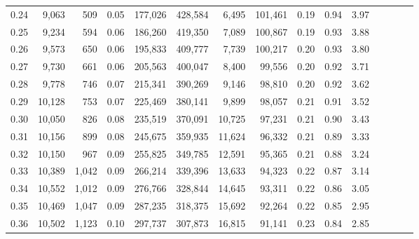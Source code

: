 \begin{tabular}{rrrcrrrrrrrrrrr}
0.24 &   9,063 &    509 &                                       0.05 &  177,026 &  428,584 &    6,495 &  101,461 &  0.19 &  0.94 &                         3.97 \\
0.25 &   9,234 &    594 &                                       0.06 &  186,260 &  419,350 &    7,089 &  100,867 &  0.19 &  0.93 &                         3.88 \\
0.26 &   9,573 &    650 &                                       0.06 &  195,833 &  409,777 &    7,739 &  100,217 &  0.20 &  0.93 &                         3.80 \\
0.27 &   9,730 &    661 &                                       0.06 &  205,563 &  400,047 &    8,400 &   99,556 &  0.20 &  0.92 &                         3.71 \\
0.28 &   9,778 &    746 &                                       0.07 &  215,341 &  390,269 &    9,146 &   98,810 &  0.20 &  0.92 &                         3.62 \\
0.29 &  10,128 &    753 &                                       0.07 &  225,469 &  380,141 &    9,899 &   98,057 &  0.21 &  0.91 &                         3.52 \\
0.30 &  10,050 &    826 &                                       0.08 &  235,519 &  370,091 &   10,725 &   97,231 &  0.21 &  0.90 &                         3.43 \\
0.31 &  10,156 &    899 &                                       0.08 &  245,675 &  359,935 &   11,624 &   96,332 &  0.21 &  0.89 &                         3.33 \\
0.32 &  10,150 &    967 &                                       0.09 &  255,825 &  349,785 &   12,591 &   95,365 &  0.21 &  0.88 &                         3.24 \\
0.33 &  10,389 &  1,042 &                                       0.09 &  266,214 &  339,396 &   13,633 &   94,323 &  0.22 &  0.87 &                         3.14 \\
0.34 &  10,552 &  1,012 &                                       0.09 &  276,766 &  328,844 &   14,645 &   93,311 &  0.22 &  0.86 &                         3.05 \\
0.35 &  10,469 &  1,047 &                                       0.09 &  287,235 &  318,375 &   15,692 &   92,264 &  0.22 &  0.85 &                         2.95 \\
0.36 &  10,502 &  1,123 &                                       0.10 &  297,737 &  307,873 &   16,815 &   91,141 &  0.23 &  0.84 &                         2.85 \\

\end{tabular}
